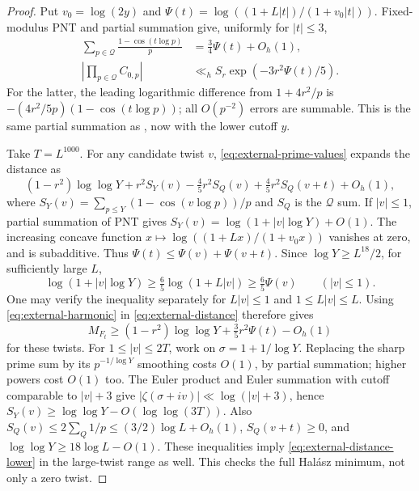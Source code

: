 \documentclass[11pt]{article}
\theoremstyle{definition}
\theoremstyle{remark}
\numberwithin{equation}{section}
\newcommand{\Qset}{\mathcal Q}
\begin{document}
\begin{proof}
Put $v_0=\log(2y)$ and $\Psi(t)=\log((1+L|t|)/(1+v_0|t|))$.
Fixed-modulus PNT and partial summation give, uniformly for $|t|\le3$,
\begin{align}
 \sum_{p\in\Qset}\frac{1-\cos(t\log p)}p&=\tfrac34\Psi(t)+O_h(1),\label{eq:external-harmonic}\\
 \left|\prod_{p\in\Qset}C_{0,p}\right|&\ll_h S_r\exp(-3r^2\Psi(t)/5).\label{eq:external-prefactor}
\end{align}
For the latter, the leading logarithmic difference from $1+4r^2/p$ is
$-(4r^2/5p)(1-\cos(t\log p))$; all $O(p^{-2})$ errors are summable.
This is the same partial summation as \cite[(4.12), p.~18]{OpenAI007}, now with the lower cutoff $y$.

Take $T=L^{1000}$. For any candidate twist $v$, \eqref{eq:external-prime-values} expands the distance as
\begin{equation}\label{eq:external-distance}
 (1-r^2)\log\log Y+r^2S_Y(v)-\tfrac45r^2S_Q(v)+\tfrac45r^2S_Q(v+t)+O_h(1),
\end{equation}
where $S_Y(v)=\sum_{p\le Y}(1-\cos(v\log p))/p$ and $S_Q$ is the $\Qset$ sum.
If $|v|\le1$, partial summation of PNT gives $S_Y(v)=\log(1+|v|\log Y)+O(1)$.
The increasing concave function $x\mapsto\log((1+Lx)/(1+v_0x))$ vanishes at zero, and is subadditive.
Thus $\Psi(t)\le\Psi(v)+\Psi(v+t)$. Since $\log Y\ge L^{18}/2$, for sufficiently large $L$,
\begin{equation}\label{eq:external-small-twist}
 \log(1+|v|\log Y)\ge\tfrac65\log(1+L|v|)\ge\tfrac65\Psi(v)\qquad(|v|\le1).
\end{equation}
One may verify the inequality separately for $L|v|\le1$ and $1\le L|v|\le L$.
Using \eqref{eq:external-harmonic} in \eqref{eq:external-distance} therefore gives
\begin{equation}\label{eq:external-distance-lower}
 M_{F_t}\ge(1-r^2)\log\log Y+\tfrac35r^2\Psi(t)-O_h(1)
\end{equation}
for these twists.
For $1\le|v|\le2T$, work on $\sigma=1+1/\log Y$. Replacing the sharp prime sum by its $p^{-1/\log Y}$
smoothing costs $O(1)$, by partial summation; higher powers cost $O(1)$ too.
The Euler product and Euler summation with cutoff comparable to $|v|+3$ give
$|\zeta(\sigma+iv)|\ll\log(|v|+3)$, hence
$S_Y(v)\ge\log\log Y-O(\log\log(3T))$.
Also $S_Q(v)\le2\sum_Q1/p\le(3/2)\log L+O_h(1)$, $S_Q(v+t)\ge0$, and
$\log\log Y\ge18\log L-O(1)$. These inequalities imply \eqref{eq:external-distance-lower} in the large-twist
range as well. This checks the full Hal\'asz minimum, not only a zero twist.


\end{proof}
\end{document}
